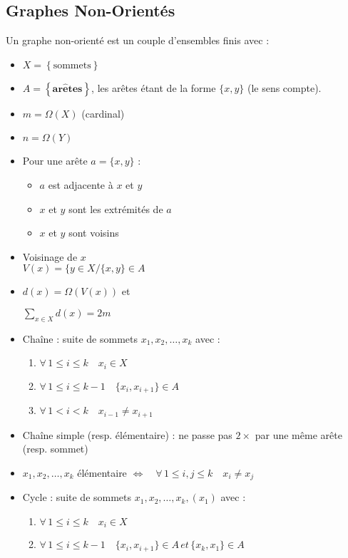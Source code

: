 \documentclass[a4paper, 8pt]{article}
\begin{document}
\begin{multicols*}{3}
\subsection*{Graphes Non-Orientés}
Un graphe non-orienté \GXA est un couple d'ensembles finis avec :
\begin{itemize}
\item $X = \left\{\text{sommets}\right\}$
\item $A = \left\{\mathbf{ar\hat{e}tes}\right\}$, les arêtes étant de la forme $\{x,y\}$ (le sens compte).
\item $m = \Omega(X)$ (cardinal)
\item $n = \Omega(Y)$
\item Pour une arête $a = \{x,y\}$ :
	\begin{itemize}
	\item $a$ est adjacente à $x$ et $y$
	\item $x$ et $y$ sont les extrémités de $a$
	\item $x$ et $y$ sont voisins
	\end{itemize}
\item Voisinage de $x$\\ $V(x) = \{y \in X / \{x,y\} \in A$
\item $d(x) = \Omega(V(x))$ et \begin{flushright}
$\sum_{x\in X}{d(x)} = 2m$
\end{flushright}
\item Chaîne : suite de sommets $x_1,x_2,\hdots,x_k$ avec :
\begin{enumerate}
\item $\forall \, 1\leqslant i \leqslant k \quad  x_i \in X$
\item $\forall \, 1\leqslant i \leqslant k-1 \quad \{x_i,x_{i+1}\} \in A$
\item $\forall \, 1< i< k \quad x_{i-1} \neq x_{i+1}$
\end{enumerate}
\item Chaîne simple (resp. élémentaire) : ne passe pas $2\times$ par une même arête (resp. sommet)
\item $x_1,x_2,\hdots,x_k$ élémentaire $\Longleftrightarrow \quad \forall \, 1\leqslant i,j \leqslant k \quad  x_i \neq x_j$
\item Cycle : suite de sommets $x_1,x_2,\hdots,x_k,(x_1)$ avec :
\begin{enumerate}
\item $\forall \, 1\leqslant i \leqslant k \quad  x_i \in X$
\item $\forall \, 1\leqslant i \leqslant k-1 \quad \{x_i,x_{i+1}\} \in A \,et\, \{x_k,x_{1}\} \in A$

\end{enumerate}
\end{itemize}
\end{multicols*}
\end{document}
